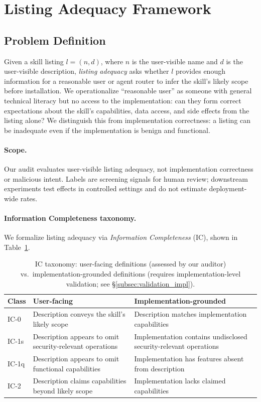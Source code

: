 \documentclass[11pt]{article}
\begin{document}
\section{Listing Adequacy Framework}
\label{sec:method}

\subsection{Problem Definition}
\label{subsec:adequacy}

Given a skill listing $l = (n, d)$, where $n$ is the
user-visible name and $d$ is the user-visible description,
\emph{listing adequacy} asks whether $l$ provides enough
information for a reasonable user or agent router to
infer the skill's likely scope before installation.
We operationalize ``reasonable user'' as someone with
general technical literacy but no access to the
implementation: can they form correct expectations
about the skill's capabilities, data access, and
side effects from the listing alone?
We distinguish this from implementation correctness:
a listing can be inadequate even if the implementation
is benign and functional.

\paragraph{Scope.}
Our audit evaluates user-visible listing adequacy,
not implementation correctness or malicious intent.
Labels are screening signals for human review;
downstream experiments test effects in controlled
settings and do not estimate deployment-wide rates.

\paragraph{Information Completeness taxonomy.}
We formalize listing adequacy via \emph{Information
Completeness} (IC), shown in Table~\ref{tab:ic_taxonomy}.

\begin{table}[t]
\centering\small
\begin{tabular}{lp{2.9cm}p{2.9cm}}
\toprule
\textbf{Class} & \textbf{User-facing} & \textbf{Implementation-grounded} \\
\midrule
IC-0 & Description conveys the skill's likely scope & Description matches implementation capabilities \\
IC-1s & Description appears to omit security-relevant operations & Implementation contains undisclosed security-relevant operations \\
IC-1q & Description appears to omit functional capabilities & Implementation has features absent from description \\
IC-2 & Description claims capabilities beyond likely scope & Implementation lacks claimed capabilities \\
\bottomrule
\end{tabular}
\caption{IC taxonomy: user-facing definitions (assessed
by our auditor) vs.\ implementation-grounded definitions
(requires implementation-level validation;
see \S\ref{subsec:validation_impl}).}
\label{tab:ic_taxonomy}
\end{table}
\end{document}
